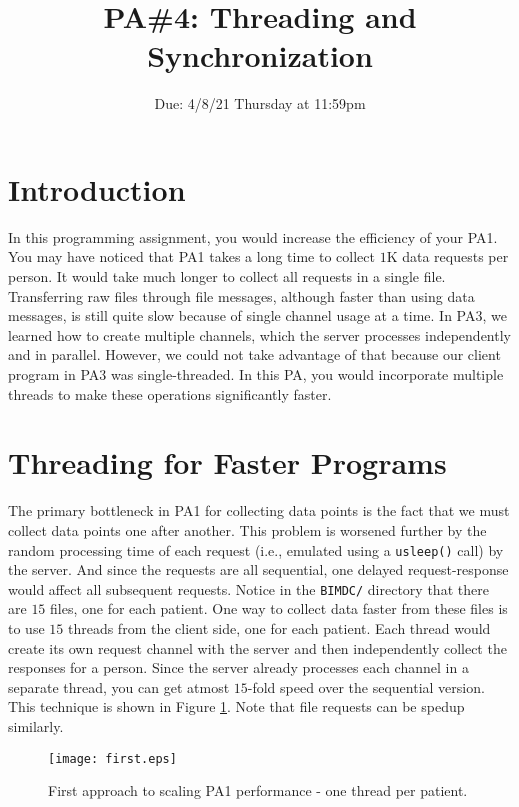 \documentclass[12pt]{article}
\newcommand{\duedate}{4/8/21 Thursday at 11:59pm}
\begin{document}
\title{PA\#4: Threading and Synchronization}
\date{\vspace{-5ex}Due: \duedate}
\maketitle

\section*{Introduction}
In this programming assignment, you would increase the efficiency of your PA1. You may have noticed that PA1 takes a long time to collect $1$K data requests per person. It would take much longer to collect all requests in a single file. Transferring raw files through file messages, although faster than using data messages, is still quite slow because of single channel usage at a time. In PA3, we learned how to create multiple channels, which the server processes independently and in parallel. However, we could not take advantage of that because our client program in PA3 was single-threaded. In this PA, you would incorporate multiple threads to make these operations significantly faster. 

\section*{Threading for Faster Programs}
The primary bottleneck in PA1 for collecting data points is the fact that we must collect data points one after another. This problem is worsened further by the random processing time of each request (i.e., emulated using a \texttt{usleep()} call) by the server. And since the requests are all sequential, one delayed request-response would affect all subsequent requests. Notice in the \texttt{BIMDC/} directory that there are $15$ files, one for each patient. One way to collect data faster from these files is  to use $15$ threads from the client side, one for each patient. Each thread would create its own request channel with the server and then independently collect the responses for a person. Since the server already processes each channel in a separate thread, you can get atmost $15$-fold speed over the sequential version. This technique is shown in Figure \ref{fig:first}. Note that file requests can be spedup similarly.  


\begin{figure}[t]\centering
	\texttt{[image: first.eps]}
	\caption{First approach to scaling PA1 performance - one thread per patient.}
	\label{fig:first}
  \end{figure}
\end{document}
